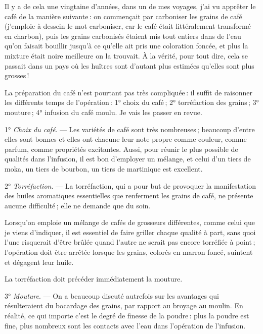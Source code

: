 Il y a de cela une vingtaine d'années, dans un de mes voyages, j'ai vu apprêter
le café de la manière suivante : on commençait par carboniser les grains de
café (j'emploie à dessein le mot carboniser, car le café était littéralement
transformé en charbon), puis les grains carbonisés étaient mis tout entiers
dans de l'eau qu'on faisait bouillir jusqu'à ce qu'elle ait pris une coloration
foncée, et plus la mixture était noire meilleure on la trouvait. À la vérité,
pour tout dire, cela se passait dans un pays où les huîtres sont d'autant plus
estimées qu'elles sont plus grosses !

La préparation du café n'est pourtant pas très compliquée : il suffit de
raisonner les différents temps de l'opération : 1° choix du café ; 2°
torréfaction des grains ; 3° mouture ; 4° infusion du café moulu. Je vais les
passer en revue.

\medskip

1° \textit{Choix du café}. — Les variétés de café sont très nombreuses ;
beaucoup d'entre elles sont bonnes et elles ont chacune leur note propre comme
couleur, comme parfum, comme propriétés excitantes. Aussi, pour réunir le plus
possible de qualités dans l'infusion, il est bon d'employer un mélange, et
celui d'un tiers de moka, un tiers de bourbon, un tiers de martinique est
excellent.

\medskip

2° \textit{Torréfaction}. — La torréfaction, qui a pour but de provoquer la
manifestation des huiles aromatiques essentielles que renferment les grains de
café, ne présente aucune difficulté ; elle ne demande que du soin.

Lorsqu'on emploie un mélange de cafés de grosseurs différentes, comme celui que
je viens d'indiquer, il est essentiel de faire griller chaque qualité à part,
sans quoi l’une risquerait d'être brûlée quand l’autre ne serait pas encore
torréfiée à point ; l'opération doit être arrêtée lorsque les grains, colorés
en marron foncé, suintent et dégagent leur huile.

La torréfaction doit précéder immédiatement la mouture.

\medskip

3° \textit{Mouture}. — On a beaucoup discuté autrefois sur les avantages qui
résulteraient du bocardage des grains, par rapport au broyage au moulin. En
réalité, ce qui importe c'est le degré de finesse de la poudre : plus la poudre
est fine, plus nombreux sont les contacts avec l'eau dans l'opération de
l'infusion.

